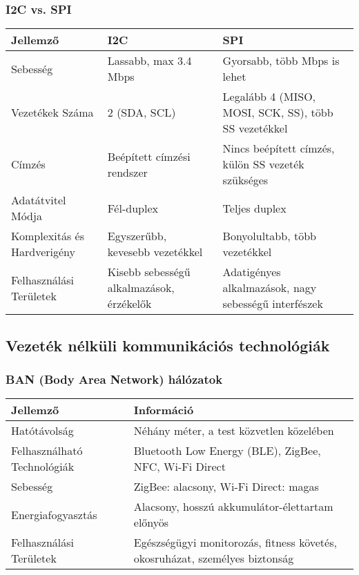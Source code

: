 \subsubsection{I2C vs. SPI}
\begin{table}[ht]
    \centering
    \begin{tabularx}{\textwidth}{X X X}
    \toprule
    \textbf{Jellemző} & \textbf{I2C} & \textbf{SPI} \\
    \midrule
    Sebesség & Lassabb, max 3.4 Mbps & Gyorsabb, több Mbps is lehet \\ \hline
    Vezetékek Száma & 2 (SDA, SCL) & Legalább 4 (MISO, MOSI, SCK, SS), több SS vezetékkel \\ \hline
    Címzés & Beépített címzési rendszer & Nincs beépített címzés, külön SS vezeték szükséges \\ \hline
    Adatátvitel Módja & Fél-duplex & Teljes duplex \\ \hline
    Komplexitás és Hardverigény & Egyszerűbb, kevesebb vezetékkel & Bonyolultabb, több vezetékkel \\ \hline
    Felhasználási Területek & Kisebb sebességű alkalmazások, érzékelők & Adatigényes alkalmazások, nagy sebességű interfészek \\
    \bottomrule
    \end{tabularx}
    \label{table:i2c_vs_spi}
\end{table}

\clearpage
\subsection{Vezeték nélküli kommunikációs technológiák}
\subsubsection{BAN (Body Area Network) hálózatok}
\begin{table}[ht]
    \centering
    \begin{tabularx}{\textwidth}{X X}
    \toprule
    \textbf{Jellemző} & \textbf{Információ} \\
    \midrule
    Hatótávolság & Néhány méter, a test közvetlen közelében \\ \hline
    Felhasználható Technológiák & Bluetooth Low Energy (BLE), ZigBee, NFC, Wi-Fi Direct \\ \hline
    Sebesség & ZigBee: alacsony, Wi-Fi Direct: magas \\ \hline
    Energiafogyasztás & Alacsony, hosszú akkumulátor-élettartam előnyös \\ \hline
    Felhasználási Területek & Egészségügyi monitorozás, fitness követés, okosruházat, személyes biztonság \\
    \bottomrule
    \end{tabularx}
    \label{table:ban_networks}
\end{table}

